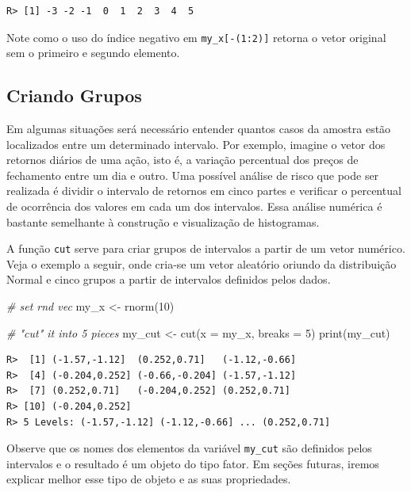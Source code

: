 \documentclass[
  11pt,
]{book}
\newenvironment{Shaded}{\begin{snugshade}}{\end{snugshade}}
\newcommand{\AttributeTok}[1]{\textcolor[rgb]{0.61,0.61,0.61}{#1}}
\newcommand{\CommentTok}[1]{\textcolor[rgb]{0.37,0.37,0.37}{\textit{#1}}}
\newcommand{\DecValTok}[1]{\textcolor[rgb]{0.06,0.06,0.06}{#1}}
\newcommand{\FunctionTok}[1]{\textcolor[rgb]{0,0,0}{#1}}
\newcommand{\NormalTok}[1]{#1}
\newcommand{\OtherTok}[1]{\textcolor[rgb]{0.37,0.37,0.37}{#1}}
\begin{document}
\begin{verbatim}
R> [1] -3 -2 -1  0  1  2  3  4  5
\end{verbatim}

Note como o uso do índice negativo em \texttt{my\_x{[}-(1:2){]}} retorna o vetor original sem o primeiro e segundo elemento.

\hypertarget{criando-grupos}{%
\subsection{Criando Grupos}\label{criando-grupos}}

Em algumas situações será necessário entender quantos casos da amostra estão localizados entre um determinado intervalo. Por exemplo, imagine o vetor dos retornos diários de uma ação, isto é, a variação percentual dos preços de fechamento entre um dia e outro. Uma possível análise de risco que pode ser realizada é dividir o intervalo de retornos em cinco partes e verificar o percentual de ocorrência dos valores em cada um dos intervalos. Essa análise numérica é bastante semelhante à construção e visualização de histogramas.

A função \texttt{cut} serve para criar grupos de intervalos a partir de um vetor numérico. Veja o exemplo a seguir, onde cria-se um vetor aleatório oriundo da distribuição Normal e cinco grupos a partir de intervalos definidos pelos dados. 

\begin{Shaded}
\begin{Highlighting}[]
\CommentTok{\# set rnd vec}
\NormalTok{my\_x }\OtherTok{\textless{}{-}} \FunctionTok{rnorm}\NormalTok{(}\DecValTok{10}\NormalTok{)}

\CommentTok{\# "cut" it into 5 pieces}
\NormalTok{my\_cut }\OtherTok{\textless{}{-}} \FunctionTok{cut}\NormalTok{(}\AttributeTok{x =}\NormalTok{ my\_x, }\AttributeTok{breaks =} \DecValTok{5}\NormalTok{)}
\FunctionTok{print}\NormalTok{(my\_cut)}
\end{Highlighting}
\end{Shaded}

\begin{verbatim}
R>  [1] (-1.57,-1.12]  (0.252,0.71]   (-1.12,-0.66] 
R>  [4] (-0.204,0.252] (-0.66,-0.204] (-1.57,-1.12] 
R>  [7] (0.252,0.71]   (-0.204,0.252] (0.252,0.71]  
R> [10] (-0.204,0.252]
R> 5 Levels: (-1.57,-1.12] (-1.12,-0.66] ... (0.252,0.71]
\end{verbatim}

Observe que os nomes dos elementos da variável \texttt{my\_cut} são definidos pelos intervalos e o resultado é um objeto do tipo fator. Em seções futuras, iremos explicar melhor esse tipo de objeto e as suas propriedades.
\end{document}
